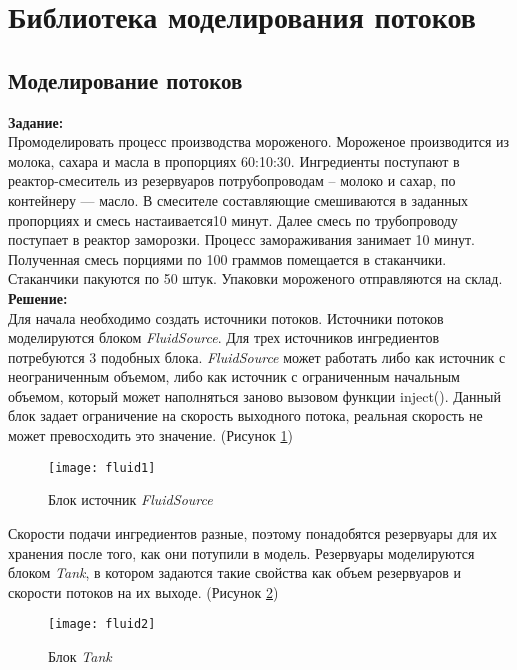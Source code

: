 \section*{Библиотека моделирования потоков}
\subsection*{Моделирование потоков}

\textbf{Задание:}\\
Промоделировать процесс производства мороженого. Мороженое производится из молока, сахара и масла в пропорциях 60:10:30. Ингредиенты поступают в реактор-смеситель из резервуаров потрубопроводам -- молоко и сахар, по контейнеру — масло. В смесителе составляющие смешиваются в заданных пропорциях и смесь настаивается10 минут. Далее смесь по трубопроводу поступает в реактор заморозки. Процесс замораживания занимает 10 минут. Полученная смесь порциями по 100 граммов помещается в стаканчики. Стаканчики пакуются по 50 штук. Упаковки мороженого отправляются на склад.\\

\textbf{Решение:}\\
Для начала необходимо создать источники потоков. Источники потоков моделируются блоком \textit{FluidSource}. Для трех источников ингредиентов потребуются 3 подобных блока. \textit{FluidSource} может работать либо как источник с неограниченным объемом, либо как источник с ограниченным начальным объемом, который может наполняться заново вызовом функции inject(). Данный блок задает ограничение на скорость выходного потока, реальная скорость не может превосходить это значение. (Рисунок \ref{fig:fluid1})
\begin{figure}[h]
	\centering \texttt{[image: fluid1]}
	\caption{Блок источник \textit{FluidSource}}
	\label{fig:fluid1}
\end{figure}

Скорости подачи ингредиентов разные, поэтому понадобятся резервуары для их хранения после того, как они потупили в модель. Резервуары моделируются блоком \textit{Tank}, в котором задаются такие свойства как объем резервуаров и скорости потоков на их выходе. (Рисунок \ref{fig:fluid2})
\begin{figure}[h]
	\centering \texttt{[image: fluid2]}
	\caption{Блок \textit{Tank}}
	\label{fig:fluid2}
\end{figure}

